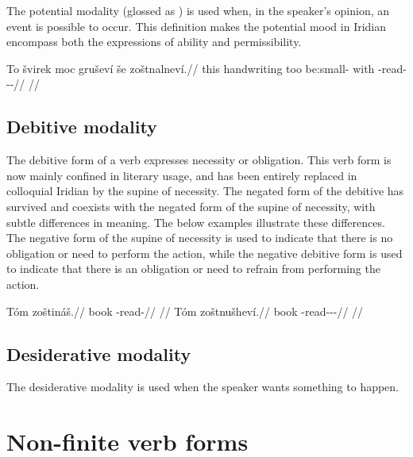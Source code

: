 The potential modality (glossed as \Pot{}) is used when, in the speaker's
opinion, an event is possible to occur. This definition makes the potential mood
in Iridian encompass both the expressions of ability and permissibility.

\pex
\begingl
\gla To švirek moc gruševí še zoštnalneví.//
\glb this handwriting too be:small-\Cont{} with \Neg{}-read-\Pv{}-\Pot{}-\Cont{}//
\glft {}//
\endgl
\xe

\subsection{Debitive modality}\label{sec:debitive}

The debitive form of a verb expresses necessity or obligation. This verb form is
now mainly confined in literary usage, and has been entirely replaced in
colloquial Iridian by the supine of necessity. The negated form of
the debitive has survived and coexists with the negated form of the supine of
necessity, with subtle differences in meaning. The below examples illustrate
these differences. The negative form of the supine of necessity is used to
indicate that there is no obligation or need to perform the action, while the
negative debitive form is used to indicate that there is an obligation or need
to refrain from performing the action.

\begin{multicols}{2}
  \pex
  \a
  \begingl
  \gla Tóm zoštináš.//
  \glb book \Neg{}-read-\SupN{}//
  \glft {}//
  \endgl
  \a \begingl
  \gla Tóm zoštnušheví.//
  \glb book \Neg{}-read-\Pv{}-\Deb{}-\Cont{}//
  \glft {}//
  \endgl
  \xe
\end{multicols}

\subsection{Desiderative modality}\label{sec:desiderative}

The desiderative modality is used when the speaker wants something to happen.




\section{Non-finite verb forms}

